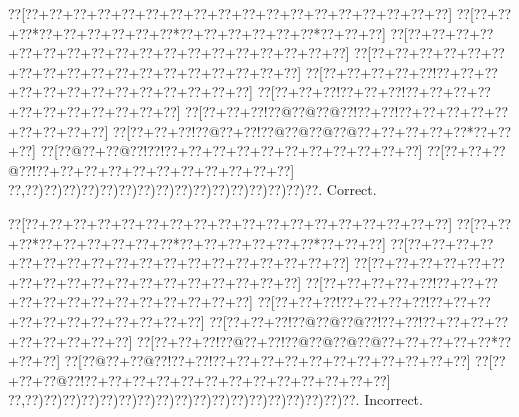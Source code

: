 \documentclass[a5paper]{article}
\begin{document}
\begin{center}
{\goo
\0??[\0??+\0??+\0??+\0??+\0??+\0??+\0??+\0??+\0??+\0??+\0??+\0??+\0??+\0??+\0??+\0??+\0??+\0??]
\0??[\0??+\0??+\0??*\0??+\0??+\0??+\0??+\0??+\0??*\0??+\0??+\0??+\0??+\0??+\0??*\0??+\0??+\0??]
\0??[\0??+\0??+\0??+\0??+\0??+\0??+\0??+\0??+\0??+\0??+\0??+\0??+\0??+\0??+\0??+\0??+\0??+\0??]
\0??[\0??+\0??+\0??+\0??+\0??+\0??+\0??+\0??+\0??+\0??+\0??+\0??+\0??+\0??+\0??+\0??+\0??+\0??]
\0??[\0??+\0??+\0??+\0??+\0??!\0??+\0??+\0??+\0??+\0??+\0??+\0??+\0??+\0??+\0??+\0??+\0??+\0??]
\0??[\0??+\0??+\0??!\0??+\0??+\0??!\0??+\0??+\0??+\0??+\0??+\0??+\0??+\0??+\0??+\0??+\0??]
\0??[\0??+\0??+\0??!\0??@\0??@\0??@\0??!\0??+\0??!\0??+\0??+\0??+\0??+\0??+\0??+\0??+\0??+\0??]
\0??[\0??+\0??+\0??!\0??@\0??+\0??!\0??@\0??@\0??@\0??@\0??+\0??+\0??+\0??+\0??*\0??+\0??+\0??]
\0??[\0??@\0??+\0??@\0??!\0??!\0??+\0??+\0??+\0??+\0??+\0??+\0??+\0??+\0??+\0??+\0??]
\0??[\0??+\0??+\0??@\0??!\0??+\0??+\0??+\0??+\0??+\0??+\0??+\0??+\0??+\0??+\0??]
\0??,\0??)\0??)\0??)\0??)\0??)\0??)\0??)\0??)\0??)\0??)\0??)\0??)\0??)\0??)\0??)\0??.
}
Correct. 

\end{center}
\begin{center}
{\goo
\0??[\0??+\0??+\0??+\0??+\0??+\0??+\0??+\0??+\0??+\0??+\0??+\0??+\0??+\0??+\0??+\0??+\0??+\0??]
\0??[\0??+\0??+\0??*\0??+\0??+\0??+\0??+\0??+\0??*\0??+\0??+\0??+\0??+\0??+\0??*\0??+\0??+\0??]
\0??[\0??+\0??+\0??+\0??+\0??+\0??+\0??+\0??+\0??+\0??+\0??+\0??+\0??+\0??+\0??+\0??+\0??+\0??]
\0??[\0??+\0??+\0??+\0??+\0??+\0??+\0??+\0??+\0??+\0??+\0??+\0??+\0??+\0??+\0??+\0??+\0??+\0??]
\0??[\0??+\0??+\0??+\0??+\0??!\0??+\0??+\0??+\0??+\0??+\0??+\0??+\0??+\0??+\0??+\0??+\0??+\0??]
\0??[\0??+\0??+\0??!\0??+\0??+\0??+\0??!\0??+\0??+\0??+\0??+\0??+\0??+\0??+\0??+\0??+\0??+\0??]
\0??[\0??+\0??+\0??!\0??@\0??@\0??@\0??!\0??+\0??!\0??+\0??+\0??+\0??+\0??+\0??+\0??+\0??+\0??]
\0??[\0??+\0??+\0??!\0??@\0??+\0??!\0??@\0??@\0??@\0??@\0??+\0??+\0??+\0??+\0??*\0??+\0??+\0??]
\0??[\0??@\0??+\0??@\0??!\0??+\0??!\0??+\0??+\0??+\0??+\0??+\0??+\0??+\0??+\0??+\0??+\0??]
\0??[\0??+\0??+\0??@\0??!\0??+\0??+\0??+\0??+\0??+\0??+\0??+\0??+\0??+\0??+\0??+\0??+\0??]
\0??,\0??)\0??)\0??)\0??)\0??)\0??)\0??)\0??)\0??)\0??)\0??)\0??)\0??)\0??)\0??)\0??)\0??)\0??.
}
Incorrect. 

\end{center}
\newpage
\end{document}
